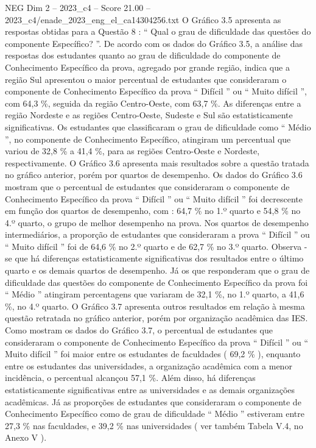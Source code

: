 \begin{textsample}{NEG Dim 2 – 2023\_c4 – Score 21.00 – 2023\_c4/enade\_2023\_eng\_el\_ca14304256.txt}
O Gráfico 3.5 apresenta as respostas obtidas para a Questão 8 : “ Qual o grau de dificuldade das questões do componente Específico? ”.
De acordo com os dados do Gráfico 3.5, a análise das respostas dos estudantes quanto ao grau de dificuldade do componente de Conhecimento Específico da prova, agregado por grande região, indica que a região Sul apresentou o maior percentual de estudantes que consideraram o componente de Conhecimento Específico da prova “ Difícil ” ou “ Muito difícil ”, com 64,3 \%, seguida da região Centro-Oeste, com 63,7 \%.
As diferenças entre a região Nordeste e as regiões Centro-Oeste, Sudeste e Sul são estatisticamente significativas.
Os estudantes que classificaram o grau de dificuldade como “ Médio ”, no componente de Conhecimento Específico, atingiram um percentual que variou de 32,8 \% a 41,4 \%, para as regiões Centro-Oeste e Nordeste, respectivamente.
O Gráfico 3.6 apresenta mais resultados sobre a questão tratada no gráfico anterior, porém por quartos de desempenho.
Os dados do Gráfico 3.6 mostram que o percentual de estudantes que consideraram o componente de Conhecimento Específico da prova “ Difícil ” ou “ Muito difícil ” foi decrescente em função dos quartos de desempenho, com : 64,7 \% no 1.º quarto e 54,8 \% no 4.º quarto, o grupo de melhor desempenho na prova.
Nos quartos de desempenho intermediários, a proporção de estudantes que consideraram a prova “ Difícil ” ou “ Muito difícil ” foi de 64,6 \% no 2.º quarto e de 62,7 \% no 3.º quarto.
Observa -se que há diferenças estatisticamente significativas dos resultados entre o último quarto e os demais quartos de desempenho.
Já os que responderam que o grau de dificuldade das questões do componente de Conhecimento Específico da prova foi “ Médio ” atingiram percentagens que variaram de 32,1 \%, no 1.º quarto, a 41,6 \%, no 4.º quarto.
O Gráfico 3.7 apresenta outros resultados em relação à mesma questão retratada no gráfico anterior, porém por organização acadêmica das IES.
Como mostram os dados do Gráfico 3.7, o percentual de estudantes que consideraram o componente de Conhecimento Específico da prova “ Difícil ” ou “ Muito difícil ” foi maior entre os estudantes de faculdades ( 69,2 \% ), enquanto entre os estudantes das universidades, a organização acadêmica com a menor incidência, o percentual alcançou 57,1 \%.
Além disso, há diferenças estatisticamente significativas entre as universidades e as demais organizações acadêmicas.
Já as proporções de estudantes que consideraram o componente de Conhecimento Específico como de grau de dificuldade “ Médio ” estiveram entre 27,3 \% nas faculdades, e 39,2 \% nas universidades ( ver também Tabela V.4, no Anexo V ).

\end{textsample}
